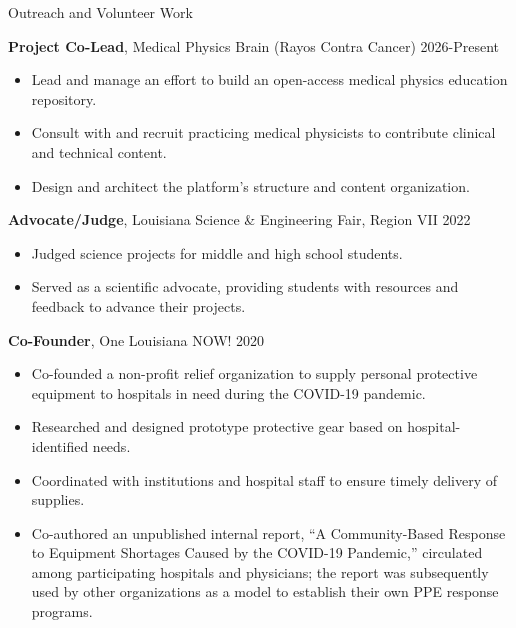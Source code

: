 \documentclass[
	11pt, %
]{resume} %
\begin{document}
\begin{rSection}{Outreach and Volunteer Work}

	\textbf{Project Co-Lead}, Medical Physics Brain (Rayos Contra Cancer) \hfill 2026-Present
	\vspace{-.2cm}
	\begin{itemize}[label=$\cdot$]
		\itemsep-0.5em
		\item Lead and manage an effort to build an open-access medical physics education repository.
		\item Consult with and recruit practicing medical physicists to contribute clinical and technical content.
		\item Design and architect the platform's structure and content organization.
	\end{itemize}


	\textbf{Advocate/Judge}, Louisiana Science \& Engineering Fair, Region VII \hfill 2022
	\vspace{-.2cm}
	\begin{itemize}[label=$\cdot$]
		\itemsep-0.5em
		\item Judged science projects for middle and high school students.
		\item Served as a scientific advocate, providing students with resources and feedback to advance their projects.
	\end{itemize}

	\textbf{Co-Founder}, One Louisiana NOW! \hfill 2020
	\vspace{-.2cm}
	\begin{itemize}[label=$\cdot$]
		\itemsep-0.5em
		\item Co-founded a non-profit relief organization to supply personal protective equipment to hospitals in need during the COVID-19 pandemic.
		\item Researched and designed prototype protective gear based on hospital-identified needs.
		\item Coordinated with institutions and hospital staff to ensure timely delivery of supplies.
		\item Co-authored an unpublished internal report, ``A Community-Based Response to Equipment Shortages Caused by the COVID-19 Pandemic,'' circulated among participating hospitals and physicians; the report was subsequently used by other organizations as a model to establish their own PPE response programs.
	\end{itemize}

\end{rSection}
\vspace{0.5cm}
\end{document}
